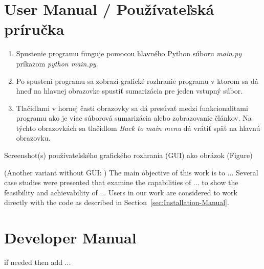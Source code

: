 \section{User Manual / Používateľská príručka}
\label{sec:User-Manual}

\begin{enumerate}
    \item Spustenie programu funguje pomocou hlavného Python súboru \emph{main.py} príkazom \emph{python main.py}. 
    
    \item Po spustení programu sa zobrazí grafické rozhranie programu v ktorom sa dá hneď na hlavnej obrazovke spustiť sumarizácia pre jeden vstupný súbor.

    \item Tlačidlami v hornej časti obrazovky sa dá presúvať medzi funkcionalitami programu ako je viac súborová sumarizácia alebo zobrazovanie článkov. Na týchto obrazovkách sa tlačidlom \emph{Back to main menu} dá vrátiť späť na hlavnú obrazovku.

\end{enumerate}

Screenshot(s) používateľského grafického rozhrania (GUI) ako obrázok (Figure)

(Another variant without GUI: ) The main objective of this work is to ... Several case studies were presented that examine the capabilities of ... to show the feasibility and achievability of ... 
Users in our work are considered to work directly with the code as described in Section~\ref{sec:Installation-Manual}.



\section{Developer Manual}
\label{sec:Developer-Manual}

if needed then add ...